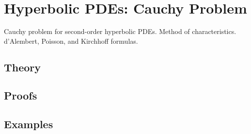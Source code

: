 
\section{Hyperbolic PDEs: Cauchy Problem}
\label{sec:2.1.02-hyperbolic-cauchy}

\begin{ticket}
Cauchy problem for second-order hyperbolic PDEs. Method of characteristics. d'Alembert, Poisson, and Kirchhoff formulas.
\end{ticket}

\subsection*{Theory}

\subsection*{Proofs}

\subsection*{Examples}
